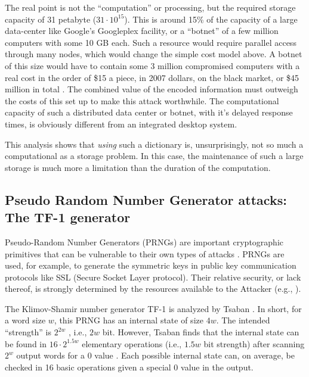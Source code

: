 \documentclass{article}
\begin{document}
The real point is not the
``computation'' or processing, but the required storage capacity of 31 petabyte
($31 \cdot 10^{15}$). This is around 15\% of the capacity of a large data-center
like Google's Googleplex facility, or a ``botnet'' of a few million computers
with some 10 GB each.  Such a resource would require parallel access through
many nodes, which would change the simple cost model above.
A botnet of this size would have to contain some 3 million
compromised computers with a real cost in the order of \$15 a piece, in 2007 
dollars, on the black market, or \$45 million in total \cite{Paxsonetal2007-1315292}. 
The combined value of the
encoded information must outweigh the costs of this set up to make this attack
worthwhile. The computational capacity of such a distributed data center or botnet,
with it's delayed response times, is obviously different from an integrated
desktop system.

This analysis shows that \textit{using} such a dictionary is, unsurprisingly, not
so much a computational as a storage problem. In this case, the maintenance of
such a large storage is much more a limitation than the duration of the computation.

\subsection{Pseudo Random Number Generator attacks: The TF-1 generator}

Pseudo-Random Number Generators (PRNGs) are important cryptographic
primitives that can be
vulnerable to their own types of attacks \cite{kelsey98cryptanalytic}.
PRNGs are used, for example, to generate the symmetric keys in public key
communication protocols like SSL (Secure Socket Layer protocol).
Their relative security, or lack thereof, is
strongly determined by the resources available to the Attacker
(e.g., \cite{kelsey98cryptanalytic}).

The Klimov-Shamir number generator TF-1 is analyzed by Tsaban
\cite{tsaban:0507063}. In short, for a word size $w$, this PRNG has an
internal state of size $4w$. The intended ``strength'' is $2^{2w}$
\cite{KlimovShamir04,tsaban:0507063}, i.e., $2w$ bit. However, Tsaban finds that the internal
state can be found in $16 \cdot 2^{1.5 w}$ elementary operations (i.e.,
$1.5w$ bit strength) after scanning  $2^w$ output words for a $0$ value
\cite{tsaban:0507063}. Each possible internal state can, on average, be checked
in 16 basic operations given a special $0$ value in the output.
\end{document}
